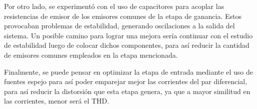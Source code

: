 Por otro lado, se experimentó con el uso de capacitores para acoplar las resistencias de emisor de los emisores comunes de la etapa de ganancia. Estos provocaban problemas de estabilidad, generando oscilaciones a la salida del sistema. Un posible camino para lograr una mejora sería continuar con el estudio de estabilidad luego de colocar dichos componentes, para así reducir la cantidad de emisores comunes empleados en la etapa mencionada.

Finalmente, se puede pensar en optimizar la etapa de entrada mediante el uso de fuentes espejo para así poder emparejar mejor las corrientes del par diferencial, para así reducir la distorsión que esta etapa genera, ya que a mayor similitud en las corrientes, menor será el THD.